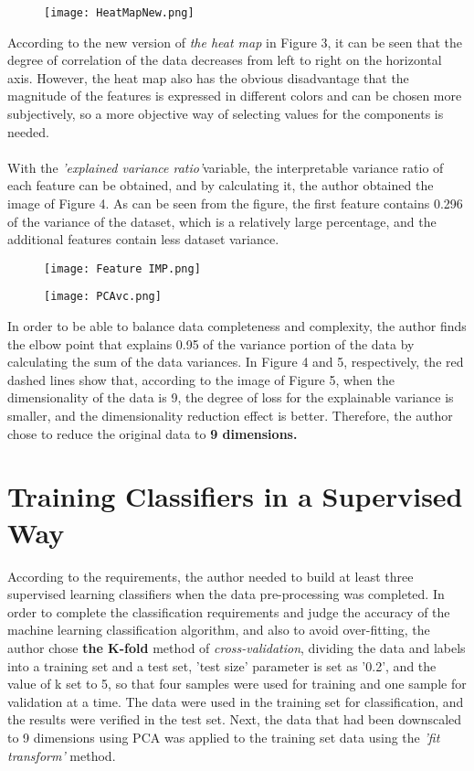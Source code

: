 \documentclass[10pt,twocolumn]{article}
\begin{document}
	\begin{figure}[h]
		\centering
		\texttt{[image: HeatMapNew.png]}
		\caption{}
	\end{figure}	
	
	According to the new version of \textit{the heat map} in Figure 3, it can be seen that the degree of correlation of the data decreases from left to right on the horizontal axis. However, the heat map also has the obvious disadvantage that the magnitude of the features is expressed in different colors and can be chosen more subjectively, so a more objective way of selecting values for the components is needed.
	\\ \hspace*{\fill} \\
	
	With the \textit{'explained variance ratio'}variable, the interpretable variance ratio of each feature can be obtained, and by calculating it, the author obtained the image of Figure 4. As can be seen from the figure, the first feature contains 0.296 of the variance of the dataset, which is a relatively large percentage, and the additional features contain less dataset variance.
	
	\begin{figure}[h]
		\centering
		\texttt{[image: Feature IMP.png]}
		\caption{}
	\end{figure}	
	
	\begin{figure}[h]
		\centering
		\texttt{[image: PCAvc.png]}
		\caption{}
	\end{figure}	
	
	In order to be able to balance data completeness and complexity, the author finds the elbow point that explains 0.95 of the variance portion of the data by calculating the sum of the data variances. In Figure 4 and 5, respectively, the red dashed lines show that, according to the image of Figure 5, when the dimensionality of the data is 9, the degree of loss for the explainable variance is smaller, and the dimensionality reduction effect is better. Therefore,
	the author chose to reduce the original data to \textbf{9 dimensions.}
	
	\section{Training Classifiers in a Supervised Way}	
	According to the requirements, the author needed to build at least three supervised learning classifiers when the data pre-processing was completed. In order to complete the classification requirements and judge the accuracy of the machine learning classification algorithm, and also to avoid over-fitting, the author chose \textbf{the K-fold} method of \textit{cross-validation}, dividing the data and labels into a training set and a test set, 'test size' parameter is set as '0.2', and the value of k set to 5, so that four samples were used for training and one sample for validation at a time. The data were used in the training set for classification, and the results were verified in the test set. Next, the data that had been downscaled to 9 dimensions using PCA was applied to the training set data using the \textit{'fit transform'} method.
	
\end{document}
